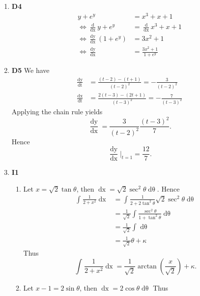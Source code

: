 \documentclass[12pt,oneside]{book}
\begin{document}
\begin{enumerate}
        \item \textbf{D4} \begin{align*}
            y + e^y &= x^3 + x + 1 \\
            \iff \frac{\mathop{\mathrm{d}}}{\mathop{\mathrm{d}x}} y + e^y &= \frac{\mathop{\mathrm{d}}}{\mathop{\mathrm{d}x}} x^3 + x + 1 \\
            \iff \frac{\mathop{\mathrm{d}y}}{\mathop{\mathrm{d}x}} (1 + e^y) &= 3x^2 + 1 \\
            \iff \frac{\mathop{\mathrm{d}y}}{\mathop{\mathrm{d}x}} &= \frac{3x^2+1}{1+e^y}
        \end{align*}
        \item \textbf{D5} We have \begin{align*}
            \frac{\mathop{\mathrm{d}y}}{\mathop{\mathrm{d}t}} &= \frac{(t-2) - (t+1)}{(t-2)^2} = -\frac{3}{(t-2)^2}\\
            \frac{\mathop{\mathrm{d}x}}{\mathop{\mathrm{d}t}} &= \frac{2(t-3) - (2t+1)}{(t-3)^2} = - \frac{7}{(t-3)^2}
        \end{align*} Applying the chain rule yields \[
            \frac{\mathop{\mathrm{d}y}}{\mathop{\mathrm{d}x}} = \frac{3}{(t-2)^2} \frac{(t-3)^2}{7}
        .\] Hence \[
            \frac{\mathop{\mathrm{d}y}}{\mathop{\mathrm{d}x}} \Big|_{t = 1} = \frac{12}{7}
        .\] 
        \item \textbf{I1} \begin{enumerate}
            \item Let $x = \sqrt{2} \tan \theta$, then $\mathop{\mathrm{d}x} = \sqrt{2} \sec^2 \theta \mathop{\mathrm{d}\theta}$. Hence \begin{align*}
                \int_{}^{} \frac{1}{2+x^2} \mathop{\mathrm{d}x} &= \int_{}^{} \frac{1}{2 + 2 \tan^2 \theta}   \sqrt{2} \sec^2 \theta \mathop{\mathrm{d}\theta} \\
                &= \frac{1}{\sqrt{2}} \int_{}^{} \frac{\sec^2 \theta}{1 + \tan^2 \theta} \mathop{\mathrm{d}\theta}  \\
                &=  \frac{1}{\sqrt{2}} \int_{}^{} \mathop{\mathrm{d}\theta} \\
                &= \frac{1}{\sqrt{2}} \theta + \kappa 
            \end{align*}
            Thus \[
                \int_{}^{} \frac{1}{2+x^2} \mathop{\mathrm{d}x} = \frac{1}{\sqrt{2}} \arctan \left( \frac{x}{\sqrt{2}} \right)  + \kappa
            .\] 
            \item Let $x - 1 = 2 \sin \theta$, then $\mathop{\mathrm{d}x} = 2 \cos \theta \mathop{\mathrm{d}\theta} $ Thus \begin{align*}

\end{align*}
\end{enumerate}
\end{enumerate}
\end{document}
